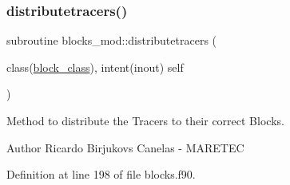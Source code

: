 \subsubsection{\texorpdfstring{distributetracers()}{distributetracers()}}
{\footnotesize\ttfamily subroutine blocks\+\_\+mod\+::distributetracers (\begin{DoxyParamCaption}\item[{class(\mbox{\hyperlink{structblocks__mod_1_1block__class}{block\+\_\+class}}), intent(inout)}]{self }\end{DoxyParamCaption})\hspace{0.3cm}{\ttfamily [private]}}



Method to distribute the Tracers to their correct Blocks. 

\begin{DoxyAuthor}{Author}
Ricardo Birjukovs Canelas -\/ M\+A\+R\+E\+T\+EC 
\end{DoxyAuthor}


Definition at line 198 of file blocks.\+f90.


